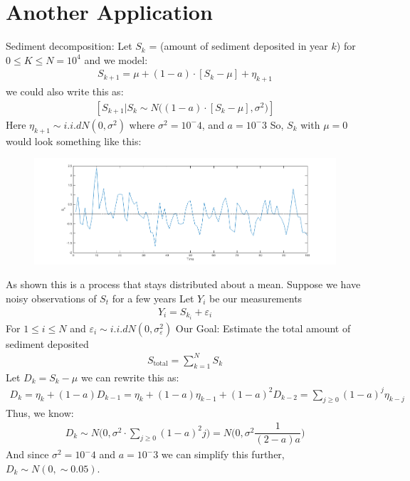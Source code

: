 \documentclass[../../../Master/AppliedStochastics.tex]{subfiles}
\begin{document}
\section{Another Application}
Sediment decomposition: 
Let $S_{k}$ = (amount of sediment deposited in year $k$) for $0\leq K \leq N=10^4$ 
and we model: 
$$\begin{aligned}
S_{k+1} = \mu + (1-a) \cdot [S_{k}-\mu] + \eta_{k+1}
\end{aligned}$$
we could also write this as: 
$$\begin{aligned}
[S_{k+1}\vert S_{k} \sim N\big((1-a) \cdot [S_{k}-\mu], \sigma^2\big)]
\end{aligned}$$
Here $\eta_{k+1} \sim i.i.d N(0, \sigma^2)$ where $\sigma^2 = 10^-4$, and $a=10^-3$
So, $S_{k}$ with $\mu=0$ would look something like this: 
\begin{figure}[H]
	\centering
	\includegraphics[width=0.7\linewidth]{process}
	\caption*{}
	\label{fig:process}
\end{figure}
As shown this is a process that stays distributed about a mean. 
Suppose we have noisy observations of $S_{t}$ for a few years 
Let $Y_{i}$ be our measurements 
$$\begin{aligned}
Y_{i} = S_{k_{i}} + \varepsilon_{i}  
\end{aligned}$$
For $1 \leq i \leq N$ and $\varepsilon_{i} \sim i.i.d N(0, \sigma_{\varepsilon}^2)$ 
Our Goal: Estimate the total amount of sediment deposited 
$$\begin{aligned}
S_{\mathrm{total}} = \sum_{k=1}^{N} S_{k}   
\end{aligned}$$
Let $D_{k} = S_{k}-\mu$ we can rewrite this as: 
$$\begin{aligned}
D_{k} = \eta_{k} + (1-a)D_{k-1} =  \eta_{k} + (1-a)\eta_{k-1} + (1-a)^2 D_{k-2} = \sum_{j\geq0}(1-a)^j \eta_{k-j}
\end{aligned}$$
Thus, we know: 
$$\begin{aligned}
D_{k}\sim N\bigg(0, \sigma^2 \cdot \sum_{j\geq0}(1-a)^2j\bigg) = N\bigg(0, \sigma^2 \dfrac{1}{(2-a)a}\bigg)
\end{aligned}$$
And since $\sigma^2 = 10^-4$ and $a=10^-3$ we can simplify this further, $D_{k} \sim N(0, \sim0.05)$. 
\end{document}
